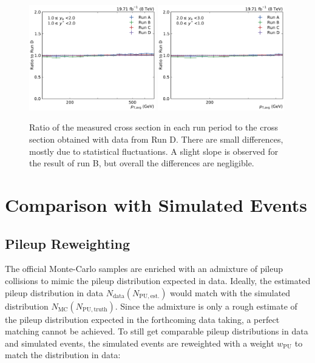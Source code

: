 \begin{figure}[htbp]
    \includegraphics[width=0.49\textwidth]{figures/measurement/run_comparison_yb1ys1.pdf}\hfill
    \includegraphics[width=0.49\textwidth]{figures/measurement/run_comparison_yb2ys0.pdf}
    \caption[Stability of result over all run periods]{Ratio of the measured
    cross section in each run period to the cross section obtained with data
    from Run D. There are small differences, mostly due to statistical fluctuations.
    A slight slope is observed for the result of run B, but overall the differences
    are negligible.}
    \label{fig:run_comparison}
\end{figure}

\section{Comparison with Simulated Events}
\label{sec:simulated_events}

\subsection{Pileup Reweighting}

The official Monte-Carlo samples are enriched with an admixture of pileup
collisions to mimic the pileup distribution expected in data. Ideally, the
estimated pileup distribution in data $N_\mathrm{data} (N_\mathrm{PU, est.})$
would match with the simulated distribution $N_\mathrm{MC} (N_\mathrm{PU,
truth})$. Since the admixture is only a rough estimate of the pileup
distribution expected in the forthcoming data taking, a perfect matching cannot
be achieved. To still get comparable pileup distributions in data and simulated
events, the simulated events are reweighted with a weight $w_\mathrm{PU}$ to
match the distribution in data: 

